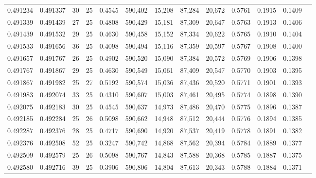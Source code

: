 \begin{tabular}{rrrrrrrrrrrrr}
0.491234 & 0.491337 &    30 &  25 &                                     0.4545 & 590,402 &  15,208 &  87,284 &  20,672 & 0.5761 & 0.1915 & 0.1409 \\
0.491339 & 0.491439 &    27 &  25 &                                     0.4808 & 590,429 &  15,181 &  87,309 &  20,647 & 0.5763 & 0.1913 & 0.1406 \\
0.491439 & 0.491532 &    29 &  25 &                                     0.4630 & 590,458 &  15,152 &  87,334 &  20,622 & 0.5765 & 0.1910 & 0.1404 \\
0.491533 & 0.491656 &    36 &  25 &                                     0.4098 & 590,494 &  15,116 &  87,359 &  20,597 & 0.5767 & 0.1908 & 0.1400 \\
0.491657 & 0.491767 &    26 &  25 &                                     0.4902 & 590,520 &  15,090 &  87,384 &  20,572 & 0.5769 & 0.1906 & 0.1398 \\
0.491767 & 0.491867 &    29 &  25 &                                     0.4630 & 590,549 &  15,061 &  87,409 &  20,547 & 0.5770 & 0.1903 & 0.1395 \\
0.491867 & 0.491982 &    25 &  27 &                                     0.5192 & 590,574 &  15,036 &  87,436 &  20,520 & 0.5771 & 0.1901 & 0.1393 \\
0.491983 & 0.492074 &    33 &  25 &                                     0.4310 & 590,607 &  15,003 &  87,461 &  20,495 & 0.5774 & 0.1898 & 0.1390 \\
0.492075 & 0.492183 &    30 &  25 &                                     0.4545 & 590,637 &  14,973 &  87,486 &  20,470 & 0.5775 & 0.1896 & 0.1387 \\
0.492185 & 0.492284 &    25 &  26 &                                     0.5098 & 590,662 &  14,948 &  87,512 &  20,444 & 0.5776 & 0.1894 & 0.1385 \\
0.492287 & 0.492376 &    28 &  25 &                                     0.4717 & 590,690 &  14,920 &  87,537 &  20,419 & 0.5778 & 0.1891 & 0.1382 \\
0.492376 & 0.492508 &    52 &  25 &                                     0.3247 & 590,742 &  14,868 &  87,562 &  20,394 & 0.5784 & 0.1889 & 0.1377 \\
0.492509 & 0.492579 &    25 &  26 &                                     0.5098 & 590,767 &  14,843 &  87,588 &  20,368 & 0.5785 & 0.1887 & 0.1375 \\
0.492580 & 0.492716 &    39 &  25 &                                     0.3906 & 590,806 &  14,804 &  87,613 &  20,343 & 0.5788 & 0.1884 & 0.1371 \\

\end{tabular}
